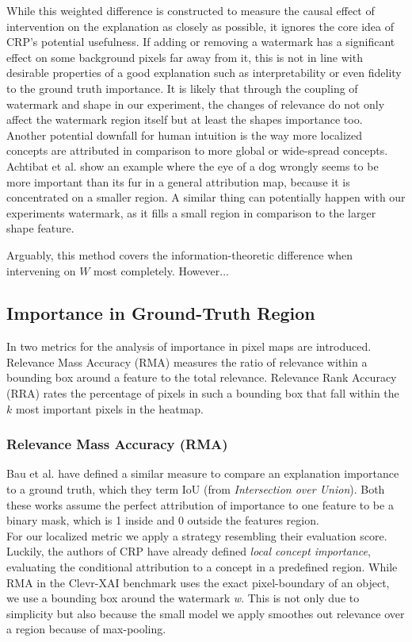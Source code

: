 While this weighted difference is constructed to measure the causal effect of intervention on the explanation as closely as possible, it ignores the core idea of CRP's potential usefulness. If adding or removing a watermark has a significant effect on some background pixels far away from it, this is not in line with desirable properties of a good explanation such as interpretability or even fidelity to the ground truth importance. It is likely that through the coupling of watermark and shape in our experiment, the changes of relevance do not only affect the watermark region itself but at least the shapes importance too. 
Another potential downfall for human intuition is the way more localized concepts are attributed in comparison to more global or wide-spread concepts. Achtibat et al. \cite{Achtibat2022} show an example where the eye of a dog wrongly seems to be more important than its fur in a general attribution map, because it is concentrated on a smaller region. A similar thing can potentially happen with our experiments watermark, as it fills a small region in comparison to the larger shape feature. 

Arguably, this method covers the information-theoretic difference when intervening on $W$ most completely. However...

\subsection{Importance in Ground-Truth Region}
In \cite{Arras2022} two metrics for the analysis of importance in pixel maps are introduced. Relevance Mass Accuracy (RMA) measures the ratio of relevance within a bounding box around a feature to the total relevance. Relevance Rank Accuracy (RRA) rates the percentage of pixels in such a bounding box that fall within the $k$ most important pixels in the heatmap.

\subsubsection{Relevance Mass Accuracy (RMA)}
Bau et al. \cite{Bau2017, Bau2020} have defined a similar measure to compare an explanation importance to a ground truth, which they term IoU (from \textit{Intersection over Union}). Both these works assume the perfect attribution of importance to one feature to be a binary mask, which is 1 inside and 0 outside the features region. \\

For our localized metric we apply a strategy resembling their evaluation score. 
Luckily, the authors of CRP have already defined \textit{local concept importance}, evaluating the conditional attribution to a concept in a predefined region. 
While RMA in the Clevr-XAI benchmark uses the exact pixel-boundary of an object, we use a bounding box around the watermark \textit{w}. This is not only due to simplicity but also because the small model we apply smoothes out relevance over a region because of max-pooling. \\

